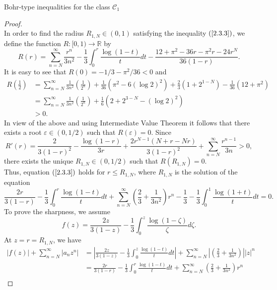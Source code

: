 \documentclass[12pt,a4paper,reqno]{amsart}
\theoremstyle{definition}
\theoremstyle{plain}
\numberwithin{equation}{section}
\begin{document}
\begin{section}{Bohr-type inequalities for the class $\mathcal{C}_1$}
\begin{proof}
\begin{equation*}
\end{equation*}
In order to find the radius $R_{1,N}\in (0, 1)$ satisfying the inequality $(\ref{2.3.3})$, we define the function $R:[0, 1)\rightarrow\mathbb{R}$ by
\begin{equation*}
R(r)=\sum_{n=N}^{\infty}   \frac{r^{n}}{3n^2} -\frac{1}{3} \int_{0}^{r} \frac{\log(1-t)}{t} dt- \frac{12+\pi ^2-36 r-\pi ^2 r-24 r^N}{36 (1-r)}.
\end{equation*}
It is easy to see that
$R(0)=-1/3-\pi^2/36<0$ and
\begin{align*}
R\left(\frac{1}{2}\right)&=\sum_{n=N}^{\infty}\frac{1}{3n^2}\left(\frac{1}{2^{n}}\right)+\frac{1}{36} \left(\pi ^2-6 (\log2)^2\right)+\frac{2}{3} \left(1+2^{1-N}\right)-\frac{1}{36} \left(12+\pi ^2\right)\\
&=\sum_{n=N}^{\infty}\frac{1}{3n^2}\left(\frac{1}{2^{n}}\right)+\frac{1}{6} \left(2+2^{3-N}-(\log 2)^2\right)\\
&>0.
\end{align*}
In view of the above and using Intermediate Value Theorem it follows that there exists a root $\varepsilon\in(0, 1/2)$ such that $R(\varepsilon)=0.$
Since \
\[
R'(r)=\frac{2}{3 (1-r)^2}-\frac{\log(1-r)}{3 r}+\frac{2 r^{N-1} (N+r-N r)}{3 (1-r)^2}+\sum_{n=N}^{\infty}   \frac{r^{n-1}}{3n}>0,
\] there exists the unique $ R_{1,N}\in (0, 1/2)$ such that $R(R_{1,N})=0.$
\\
\noindent
Thus, equation $(\ref{2.3.3})$ holds for $r \le R_{1,N}$, where $R_{1,N}$ is the solution of the equation
\begin{equation*}
\frac{2r}{3(1-r)}-\frac{1}{3} \int_{0}^{r} \frac{\log(1-t)}{t} dt+ \sum_{n=N}^{\infty} \left( \frac{2}{3} + \frac{1}{3n^2} \right) r^{n} -\frac{1}{3}- \frac{1}{3} \int_{0}^{1} \frac{\log(1+t)}{t} dt=0.
\end{equation*}
To prove the sharpness, we assume
\begin{equation*}
   f(z)= \frac{2z}{3(1-z)} - \frac{1}{3} \int_{0}^{z} \frac{\log(1-\zeta)}{\zeta} d\zeta.
\end{equation*}
At $z=r=R_{1,N}$, we have
\begin{align*}%
|f(z)|+ \sum_{n=N}^{\infty} |a_n z^n|&=  \left|\frac{2z}{3(1-z)} - \frac{1}{3} \int_{0}^{z} \frac{\log(1-t)}{t} dt \right|+\sum_{n=N}^{\infty} \left|\left( \frac{2}{3} + \frac{1}{3 n^2} \right)\right||z|^{n}\\
 &=\frac{2r}{3(1-r)} - \frac{1}{3} \int_{0}^{r} \frac{\log(1-t)}{t} dt +\sum_{n=N}^{\infty} \left( \frac{2}{3} + \frac{1}{3 n^2} \right)r^{n}\\

\end{align*}
\end{proof}
\end{section}
\end{document}
